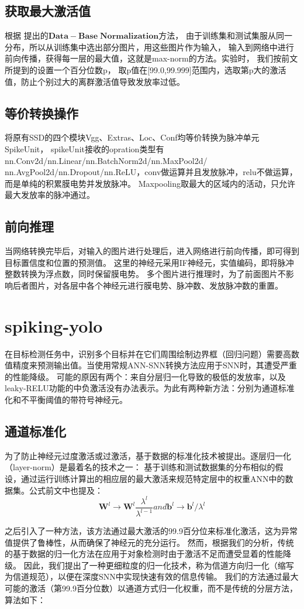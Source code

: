 \subsection{获取最大激活值}
\par
根据
提出的$\mathbf{Data-Base\; Normalization}$方法，
由于训练集和测试集服从同一分布，所以从训练集中选出部分图片，用这些图片作为输入，
输入到网络中进行前向传播，获得每一层的最大值，这就是max-norm的方法。实验时，
我们按前文所提到的设置一个百分位数p，
取p值在[99.0,99.999]范围内，选取第p大的激活值，防止个别过大的离群激活值导致发放率过低。
\subsection{等价转换操作}
\par
将原有SSD的四个模块Vgg、Extras、Loc、Conf均等价转换为脉冲单元SpikeUnit，
spikeUnit接收的opration类型有 nn.Conv2d/nn.Linear/nn.BatchNorm2d/nn.MaxPool2d/
nn.AvgPool2d/nn.Dropout/nn.ReLU，conv做运算并且发放脉冲，relu不做运算，而是单纯的积累膜电势并发放脉冲。
Maxpooling取最大的区域内的活动，只允许最大发放率的脉冲通过。
\subsection{前向推理}
\par
当网络转换完毕后，对输入的图片进行处理后，进入网络进行前向传播，即可得到目标置信度和位置的预测值。
这里的神经元采用IF神经元，实值编码，即将脉冲整数转换为浮点数，同时保留膜电势。
多个图片进行推理时，为了前面图片不影响后者图片，对各层中各个神经元进行膜电势、脉冲数、发放脉冲数的重置。
\section{spiking-yolo}
\par
在目标检测任务中，识别多个目标并在它们周围绘制边界框（回归问题）需要高数值精度来预测输出值。当使用常规ANN-SNN转换方法应用于SNN时，其遭受严重的性能降级。
可能的原因有两个：来自分层归一化导致的极低的发放率，以及leaky-RELU功能的中负激活没有办法表示。为此有两种新方法：分别为通道标准化和不平衡阈值的带符号神经元。
\subsection{通道标准化}
\par
为了防止神经元过度激活或过激活，基于数据的标准化技术被提出。逐层归一化（layer-norm）是最着名的技术之一：
基于训练和测试数据集的分布相似的假设，通过运行训练计算出的相应层的最大激活来规范特定层中的权重ANN中的数据集。公式前文中也提及：
\[
\mathbf{W}^l \to \mathbf{W}^l \frac{\lambda^l}{\lambda^{l-1}} and \mathbf{b}^l \to \mathbf{b}^l / \lambda^l
\]
\par
之后引入了一种方法，该方法通过最大激活的99.9百分位来标准化激活，这为异常值提供了鲁棒性，从而确保了神经元的充分运行。
然而，根据我们的分析，传统的基于数据的归一化方法在应用于对象检测时由于激活不足而遭受显着的性能降级。
因此，我们提出了一种更细粒度的归一化技术，称为信道方向归一化（缩写为信道规范），以便在深度SNN中实现快速有效的信息传输。
我们的方法通过最大可能的激活（第99.9百分位数）以通道方式归一化权重，而不是传统的分层方法，算法如下：

